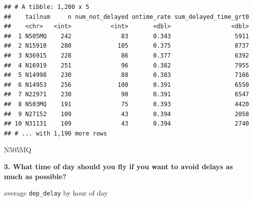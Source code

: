 \documentclass[]{book}
\newenvironment{Shaded}{\begin{snugshade}}{\end{snugshade}}
\newcommand{\DataTypeTok}[1]{\textcolor[rgb]{0.13,0.29,0.53}{#1}}
\newcommand{\DecValTok}[1]{\textcolor[rgb]{0.00,0.00,0.81}{#1}}
\newcommand{\KeywordTok}[1]{\textcolor[rgb]{0.13,0.29,0.53}{\textbf{#1}}}
\newcommand{\NormalTok}[1]{#1}
\newcommand{\OperatorTok}[1]{\textcolor[rgb]{0.81,0.36,0.00}{\textbf{#1}}}
\newcommand{\OtherTok}[1]{\textcolor[rgb]{0.56,0.35,0.01}{#1}}
\newcommand{\StringTok}[1]{\textcolor[rgb]{0.31,0.60,0.02}{#1}}
\theoremstyle{definition}
\theoremstyle{definition}
\theoremstyle{definition}
\theoremstyle{remark}
\begin{document}
\begin{Shaded}
\end{Shaded}

\begin{verbatim}
## # A tibble: 1,200 x 5
##    tailnum     n num_not_delayed ontime_rate sum_delayed_time_grt0
##    <chr>   <int>           <int>       <dbl>                 <dbl>
##  1 N505MQ    242              83       0.343                  5911
##  2 N15910    280             105       0.375                  8737
##  3 N36915    228              86       0.377                  6392
##  4 N16919    251              96       0.382                  7955
##  5 N14998    230              88       0.383                  7166
##  6 N14953    256             100       0.391                  6550
##  7 N22971    230              90       0.391                  6547
##  8 N503MQ    191              75       0.393                  4420
##  9 N27152    109              43       0.394                  2058
## 10 N31131    109              43       0.394                  2740
## # ... with 1,190 more rows
\end{verbatim}

N505MQ

\textbf{3. What time of day should you fly if you want to avoid delays
as much as possible?}

average \texttt{dep\_delay} by hour of day
\end{document}
